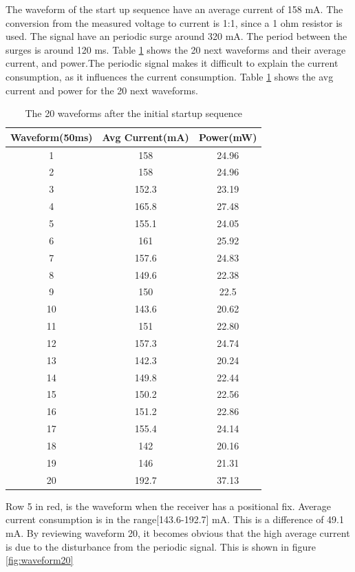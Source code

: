 The waveform of the start up sequence have an average current of 158 mA. The conversion from the measured voltage to current is 1:1, since a 1 ohm resistor is used. The signal have an periodic surge around 320 mA. The period between the surges is around 120 ms. Table \ref{Table:WIFI_ON} shows the 20 next waveforms and their average current, and power.The periodic signal makes it difficult to explain the current consumption, as it influences the current consumption. Table \ref{Table:WIFI_ON} shows the avg current and power for the 20 next waveforms.
\begin{table}[h!]
\begin{center}
 \begin{tabular}{||c c c||} 
 \hline
 Waveform(50ms) & Avg Current(mA) & Power(mW)\\ [0.5ex] 
 \hline\hline
 1 & 158    & 24.96 \\ 
 \hline
 2 & 158    & 24.96 \\
 \hline
 3 & 152.3  & 23.19 \\
 \hline
 4 & 165.8  & 27.48 \\
 \hline
 \rowcolor{red}
 5 & 155.1  & 24.05 \\ 
 \hline
 6 & 161    & 25.92 \\ 
 \hline
 7 & 157.6  & 24.83 \\
 \hline
 8 & 149.6  & 22.38 \\
 \hline
 9 & 150    & 22.5  \\
 \hline
 10 & 143.6 & 20.62 \\ 
 \hline
 11 & 151   & 22.80 \\
  \hline
 12 & 157.3 & 24.74 \\
 \hline
 13 & 142.3 & 20.24 \\ 
 \hline
 14 & 149.8 & 22.44 \\ 
 \hline
 15 & 150.2 & 22.56 \\
 \hline
 16 & 151.2 & 22.86 \\
 \hline
 17 & 155.4 & 24.14 \\
 \hline
 18 & 142   & 20.16 \\ 
 \hline
 19 & 146   & 21.31  \\
 \hline
 20 & 192.7 & 37.13 \\[1ex]
 \hline
\end{tabular}
\end{center}
\caption{The 20 waveforms after the initial startup sequence}
\label{Table:WIFI_ON}
\end{table}

Row 5 in red, is the waveform when the receiver has a positional fix. Average current consumption is in the range[143.6-192.7] mA. This is a difference of 49.1 mA. By reviewing waveform 20, it becomes obvious that the high average current is due to the disturbance from the periodic signal. This is shown in figure \ref{fig:waveform20} 





